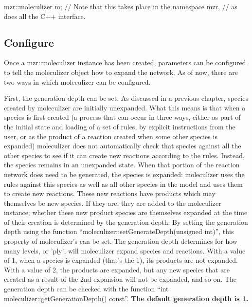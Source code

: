 \begin{ExampleCPP}[caption=Creating a moleculizer object, label=creatingmzrexample]
mzr::moleculizer m; // Note that this takes place in the namespace mzr,
                    // as does all the C++ interface.
\end{ExampleCPP}

\subsection{Configure}
Once a mzr::moleculizer instance has been created, parameters can be
configured to tell the moleculizer object how to expand the network.
As of now, there are two ways in which moleculizer can be configured.  

First, the generation depth can be set.  As discussed in a previous
chapter, species created by moleculizer are initially unexpanded.
What this means is that when a species is first created (a process
that can occur in three ways, either as part of the initial state and
loading of a set of rules, by explicit instructions from the user, or
as the product of a reaction created when some other species is
expanded) moleculizer does not automatically check that species
against all the other species to see if it can create new reactions
according to the rules.  Instead, the species remains in an unexpanded
state.  When that portion of the reaction network does need to be
generated, the species is expanded: moleculizer uses the rules against
this species as well as all other species in the model and uses them
to create new reactions.  These new reactions have products which may
themselves be new species.  If they are, they are added to the
moleculizer instance; whether these new product species are themselves
expanded at the time of their creation is determined by the generation
depth.  By setting the generation depth using the function
``moleculizer::setGenerateDepth(unsigned int)'', this property of
moleculizer's can be set.  The generation depth determines for how many
levels, or 'ply', will moleculizer expand species and reactions.  With
a value of 1, when a species is expanded (that's the 1), its products
are not expanded.  With a value of 2, the products are expanded, but
any new species that are created as a result of the 2nd expansion will
not be expanded, and so on.  The generation depth can be checked with
the function ``int moleculizer::getGenerationDepth() const''.  \bf{The
  default generation depth is 1.}

